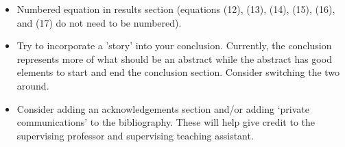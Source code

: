 \documentclass[%
 aip,
cp,  %
 amsmath,amssymb,
 reprint,%
nofootinbib
]{revtex4-2}
\begin{document}
\begin{itemize}
    \item Numbered equation in results section (equations (12), (13), (14), (15), (16), and (17) do not need to be numbered).
    
    \item Try to incorporate a 'story' into your conclusion. Currently, the conclusion represents more of what should be an abstract while the abstract has good elements to start and end the conclusion section. Consider switching the two around.
    
    \item Consider adding an acknowledgements section and/or adding `private communications' to the bibliography. These will help give credit to the supervising professor and supervising teaching assistant.
\end{itemize}
\end{document}
